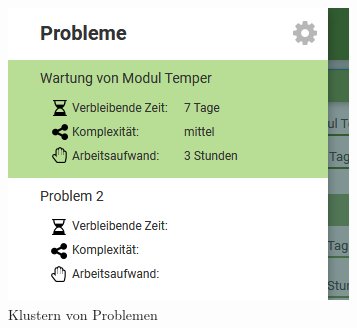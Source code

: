 \begin{figure}[htbp]
\centering
\includegraphics[scale=0.8]{DA_files/Bilder/Konzept/Skizze-Klustern-Problem.png}
\caption{Klustern von Problemen}
\label{pic:pD-Probleme-klustern}
\end{figure}